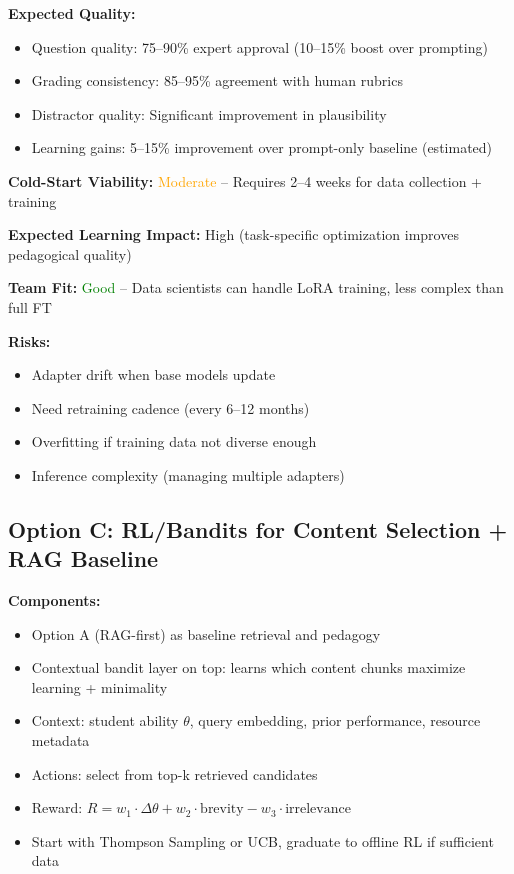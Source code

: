 \documentclass[11pt,letterpaper]{article}
\begin{document}
\textbf{Expected Quality:}
\begin{itemize}
\item Question quality: 75--90\% expert approval (10--15\% boost over prompting)
\item Grading consistency: 85--95\% agreement with human rubrics
\item Distractor quality: Significant improvement in plausibility
\item Learning gains: 5--15\% improvement over prompt-only baseline (estimated)
\end{itemize}

\textbf{Cold-Start Viability:} \textcolor{orange}{Moderate} -- Requires 2--4 weeks for data collection + training

\textbf{Expected Learning Impact:} High (task-specific optimization improves pedagogical quality)

\textbf{Team Fit:} \textcolor{green}{Good} -- Data scientists can handle LoRA training, less complex than full FT

\textbf{Risks:}
\begin{itemize}
\item Adapter drift when base models update
\item Need retraining cadence (every 6--12 months)
\item Overfitting if training data not diverse enough
\item Inference complexity (managing multiple adapters)
\end{itemize}

\subsection{Option C: RL/Bandits for Content Selection + RAG Baseline}\label{subsec:option-c}

\textbf{Components:}
\begin{itemize}
\item Option A (RAG-first) as baseline retrieval and pedagogy
\item Contextual bandit layer on top: learns which content chunks maximize learning + minimality
\item Context: student ability $\theta$, query embedding, prior performance, resource metadata
\item Actions: select from top-k retrieved candidates
\item Reward: $R = w_1 \cdot \Delta\theta + w_2 \cdot \text{brevity} - w_3 \cdot \text{irrelevance}$
\item Start with Thompson Sampling or UCB, graduate to offline RL if sufficient data
\end{itemize}
\end{document}
